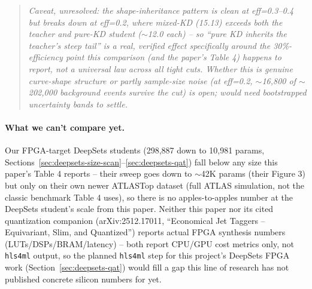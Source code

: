 \begin{quote}
\emph{Caveat, unresolved: the shape-inheritance pattern is clean at
eff=0.3--0.4 but breaks down at eff=0.2, where mixed-KD (15.13) exceeds both
the teacher and pure-KD student ($\sim$12.0 each) -- so ``pure KD inherits
the teacher's steep tail'' is a real, verified effect specifically around
the 30\%-efficiency point this comparison (and the paper's Table 4) happens
to report, not a universal law across all tight cuts. Whether this is
genuine curve-shape structure or partly sample-size noise (at eff=0.2,
$\sim$16{,}800 of $\sim$202{,}000 background events survive the cut) is
open; would need bootstrapped uncertainty bands to settle.}
\end{quote}

\paragraph{What we can't compare yet.} Our FPGA-target DeepSets students
(298{,}887 down to 10{,}981 params,
Sections~\ref{sec:deepsets-size-scan}--\ref{sec:deepsets-qat}) fall below
any size this paper's Table 4 reports -- their sweep goes down to
$\sim$42K params (their Figure 3) but only on their own newer ATLASTop
dataset (full ATLAS simulation, not the classic benchmark Table 4 uses), so
there is no apples-to-apples number at the DeepSets student's scale from
this paper. Neither this paper nor its cited quantization companion
(arXiv:2512.17011, ``Economical Jet Taggers -- Equivariant, Slim, and
Quantized'') reports actual FPGA synthesis numbers (LUTs/DSPs/BRAM/latency)
-- both report CPU/GPU cost metrics only, not \texttt{hls4ml} output, so the
planned \texttt{hls4ml} step for this project's DeepSets FPGA work
(Section~\ref{sec:deepsets-qat}) would fill a gap this line of research has
not published concrete silicon numbers for yet.
